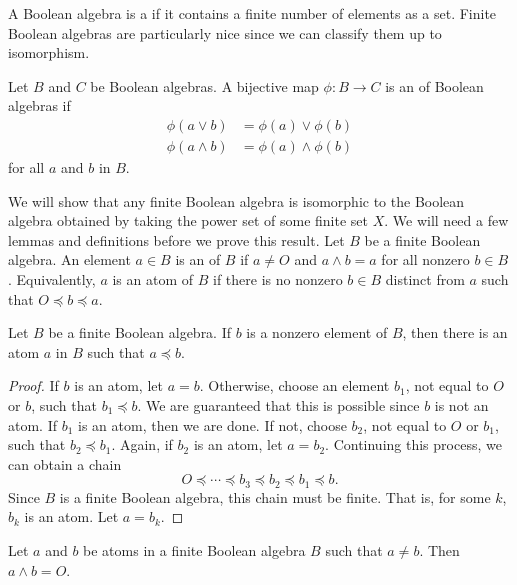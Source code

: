  
A Boolean algebra is a  if it contains a finite number of elements as a set.
Finite Boolean algebras are particularly nice since we can classify
them  up to isomorphism.   
 
 
Let $B$ and $C$ be Boolean algebras.  A bijective map $\phi : B
\rightarrow C$ is an  of Boolean
algebras  if 
\begin{align*}
\phi( a \vee b )  & = \phi(a) \vee \phi(b) \\
\phi( a \wedge b )  & = \phi(a) \wedge \phi(b)
\end{align*}
for all $a$ and $b$ in $B$. 
 
 
We will show that any finite Boolean algebra is isomorphic to the 
Boolean algebra obtained by taking the power set of some finite set 
$X$. We will need a few lemmas and definitions before we prove this result.
Let $B$ be a finite Boolean algebra. An element $a \in B$ is  an  of $B$ if $a \neq
O$ and $a \wedge b = a$ for all nonzero $b \in B$. Equivalently, $a$ is an
atom of $B$ if there is no nonzero $b \in B$ distinct from $a$ such
that $O \preceq b \preceq a$. 
 
 
\begin{lemma}
Let $B$ be a finite Boolean algebra. If $b$ is a nonzero element of
$B$, then there is an atom $a$ in $B$ such that $a \preceq b$.
\end{lemma}
 
 
\begin{proof}
If $b$ is an atom, let $a =b$. Otherwise, choose an element $b_1$, not
equal to $O$ or $b$, such that $b_1 \preceq b$. We are guaranteed that
this is possible since $b$ is not an atom. If $b_1$ is an atom, then
we are done.  If not, choose $b_2$, not equal to $O$ or $b_1$, such that 
$b_2 \preceq b_1$. Again, if $b_2$ is an atom, let $a = b_2$.
Continuing this process, we can obtain a chain
\[
O \preceq \cdots \preceq b_3 \preceq b_2 \preceq b_1 \preceq b.
\]
Since $B$ is a finite Boolean algebra, this chain must be finite.  That
is, for some $k$, $b_k$ is an atom. Let $a = b_k$.
\end{proof}
 
 
\begin{lemma}\label{boolean:zero_vee_lemma}
Let $a$ and $b$ be atoms in a finite Boolean algebra $B$ such that $a
\neq b$. Then $a \wedge b = O$.
\end{lemma}
 
